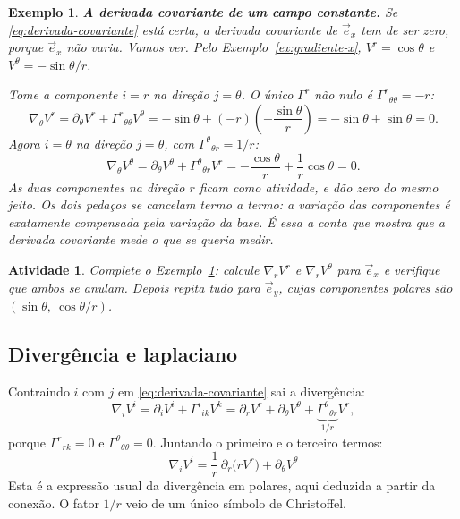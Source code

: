 \documentclass[12pt,a4paper,oneside]{book}
\theoremstyle{rgplain}
\newtheorem{example}{Exemplo}[chapter]
\newtheorem{activity}{Atividade}[chapter]
\theoremstyle{rgremark}
\begin{document}
\begin{example}
\label{ex:ex-covariante}
\textbf{A derivada covariante de um campo constante.} Se
\eqref{eq:derivada-covariante} está certa,
a derivada covariante de $\vec e_x$ tem de ser \emph{zero}, porque $\vec e_x$
não varia. Vamos ver. Pelo Exemplo~\ref{ex:gradiente-x},
$V^r=\cos\theta$ e $V^\theta=-\sin\theta/r$.

Tome a componente $i=r$ na direção $j=\theta$. O único $\Gamma^r$ não nulo é
$\Gamma^r{}_{\theta\theta}=-r$:
\[
  \nabla_\theta V^r=\partial_\theta V^r+\Gamma^r{}_{\theta\theta}V^\theta
  =-\sin\theta+(-r)\left(-\frac{\sin\theta}{r}\right)
  =-\sin\theta+\sin\theta=0 .
\]
Agora $i=\theta$ na direção $j=\theta$, com
$\Gamma^\theta{}_{\theta r}=1/r$:
\[
  \nabla_\theta V^\theta=\partial_\theta V^\theta
  +\Gamma^\theta{}_{\theta r}V^r
  =-\frac{\cos\theta}{r}+\frac1r\cos\theta=0 .
\]
As duas componentes na direção $r$ ficam como atividade, e dão zero do mesmo
jeito. \emph{Os dois pedaços se cancelam termo a termo}: a variação das
componentes é exatamente compensada pela variação da base. É essa a conta que
mostra que a derivada covariante mede o que se queria medir.
\end{example}

\begin{activity}
Complete o Exemplo~\ref{ex:ex-covariante}: calcule $\nabla_rV^r$ e
$\nabla_rV^\theta$ para $\vec e_x$ e verifique que ambos se anulam. Depois
repita tudo para $\vec e_y$, cujas componentes polares são
$(\sin\theta,\ \cos\theta/r)$.
\end{activity}

\subsection*{Divergência e laplaciano}

Contraindo $i$ com $j$ em \eqref{eq:derivada-covariante} sai a divergência:
\[
  \nabla_iV^i=\partial_iV^i+\Gamma^i{}_{ik}V^k
  =\partial_rV^r+\partial_\theta V^\theta
  +\underbrace{\Gamma^\theta{}_{\theta r}}_{1/r}V^r ,
\]
porque $\Gamma^r{}_{rk}=0$ e $\Gamma^\theta{}_{\theta\theta}=0$. Juntando o
primeiro e o terceiro termos:
\begin{equation}
  \boxed{\ \nabla_iV^i
  =\frac1r\,\partial_r\bigl(rV^r\bigr)+\partial_\theta V^\theta\ }
  \label{eq:divergencia-polar}
\end{equation}
Esta é a expressão usual da divergência em polares, aqui deduzida a partir
da conexão. O fator $1/r$ veio de um único
símbolo de Christoffel.
\end{document}
